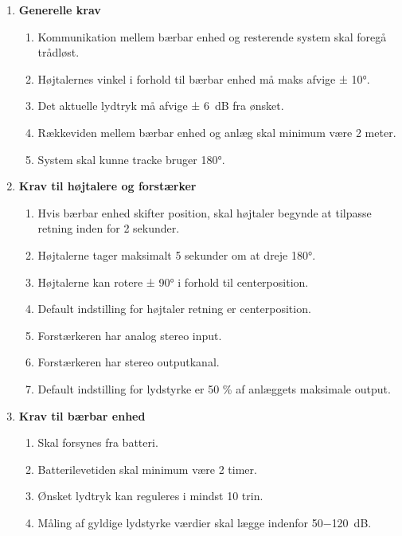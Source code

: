 \begin{enumerate}
\item \textbf{Generelle krav}
	\begin{enumerate}[label*=\arabic*.]
	\item Kommunikation mellem bærbar enhed og resterende system skal foregå trådløst. 
	\item Højtalernes vinkel i forhold til bærbar enhed må maks afvige ± 10°.
	\item Det aktuelle lydtryk må afvige ± \SI{6}{dB} fra ønsket.
	\item Rækkeviden mellem bærbar enhed og anlæg skal minimum være 2 meter.
	\item System skal kunne tracke bruger 180°.\\
	\end{enumerate}

\item \textbf{Krav til højtalere og forstærker}
	\begin{enumerate}[label*=\arabic*.]
	\item Hvis bærbar enhed skifter position, skal højtaler begynde at tilpasse retning inden for 2 sekunder.
	\item Højtalerne tager maksimalt 5 sekunder om at dreje 180°.
	\item Højtalerne kan rotere ± 90° i forhold til centerposition.
	\item Default indstilling for højtaler retning er centerposition.
	\item Forstærkeren har analog stereo input.
	\item Forstærkeren har stereo outputkanal. 
	\item Default indstilling for lydstyrke er 50 \% af anlæggets maksimale output.\\
	\end{enumerate}	
	

\item \textbf{Krav til bærbar enhed}
	\begin{enumerate}[label*=\arabic*.]
	\item Skal forsynes fra batteri.
	\item Batterilevetiden skal minimum være 2 timer.
	\item Ønsket lydtryk kan reguleres i mindst 10 trin.
	\item Måling af gyldige lydstyrke værdier skal lægge indenfor 50$-$\SI{120}{dB}.\\
	\end{enumerate}



\end{enumerate}
